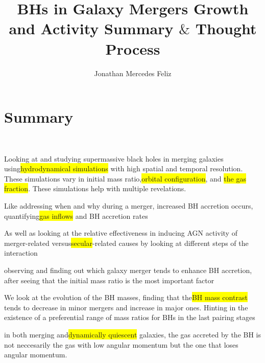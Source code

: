 \documentclass{article}
\title{BHs in Galaxy Mergers Growth and Activity Summary ${\&}$ Thought Process}
\author{Jonathan Mercedes Feliz}
\begin{document}
 
\maketitle{}
\section{Summary} 

\
\par  Looking at and studying supermassive black holes in merging galaxies using\colorbox{yellow}{hydrodynamical simulations} with high spatial and temporal resolution. These simulations vary in initial mass ratio,\colorbox{yellow}{orbital configuration}, and \colorbox{yellow}{the gas fraction}. These simulations help with multiple revelations. 
\begin{enumerate*}[label=(\roman*),%
itemjoin={{, }}, itemjoin*={{, and }}]
\item Like addressing when and why during a merger, increased BH accretion occurs, quantifying\colorbox{yellow}{gas inflows} and BH accretion rates \item As well as looking at the relative effectiveness in inducing AGN activity of merger-related versus\colorbox{yellow}{secular}-related causes by looking at different steps of the interaction \item observing and finding out which galaxy merger tends to enhance BH accretion, after seeing that the initial mass ratio is the most important factor \item We look at the evolution of the BH masses, finding that the\colorbox{yellow}{BH mass contrast} tends to decrease in minor mergers and increase in major ones. Hinting in the existence of a preferential range of mass ratios for BHs in the last pairing stages \item in both merging and\colorbox{yellow}{dynamically quiescent} galaxies, the gas accreted by the BH is not neccesarily the gas with low angular momentum but the one that loses angular momentum. \end{enumerate*} 
\
\end{document}
